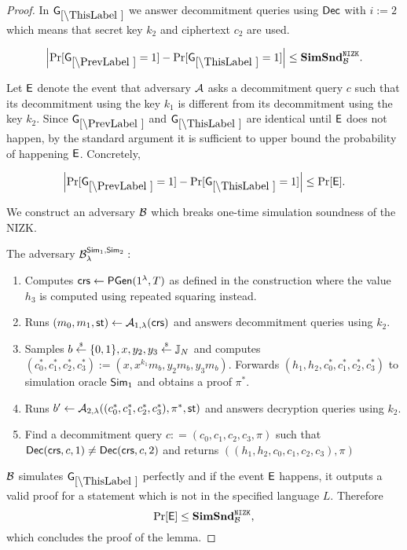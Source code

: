 \begin{proof}

In $\games_\thisgame$ we answer decommitment queries using $\mathsf{Dec}$ with $i:=2$ which means that secret key $k_2$ and ciphertext $c_2$ are used. 

\begin{lemma}
\[
\left|\Pr[\games_\prevgame = 1] - \Pr[\games_\thisgame = 1]\right| \leq \simsnd^\nizk_\advB. 
\]
\end{lemma}

Let $\mathsf{E}$ denote the event that adversary $\mathcal{A}$ asks a decommitment query $c$ such that its decommitment using the key $k_1$ is different from its decommitment using the key $k_2$. Since $\games_\prevgame$ and $\games_\thisgame$ are identical until $\mathsf{E}$ does not happen, by the standard argument it is sufficient to upper bound the probability of happening $\mathsf{E}$. Concretely,  

\[
\left|\Pr[\games_\prevgame = 1] - \Pr[\games_\thisgame = 1]\right| \leq \Pr[\event]. 
\]

We construct an adversary $\mathcal{B}$ which breaks one-time simulation soundness of the NIZK. 

The adversary $\mathcal{B}_{\lambda}^{\mathsf{Sim}_1, \mathsf{Sim}_2}:$
\vspace{-2mm}
\begin{enumerate}
\item Computes $\mathsf{crs} \leftarrow \mathsf{PGen}(1{^{\lambda}}, T)$ as defined in the construction where the value $h_3$ is computed using repeated squaring instead.
\item Runs $(m_0, m_1, \mathsf{st}) \leftarrow \mathcal{A}_{1, \lambda}(\mathsf{crs})$ and answers decommitment queries using $k_2$.
\item Samples $b \stackrel{{\scriptscriptstyle\$}}{\leftarrow} \{0,1\}, x, y_2, y_3 \stackrel{{\scriptscriptstyle\$}}{\leftarrow} \mathbb{J}_N$ and computes $(c_0^*, c_1^*, c_2^*, c_3^*):=(x, x^{k_1} m_b,\allowbreak y_2 m_b, y_3 m_b)$. Forwards $(h_1, h_2, c_0^*, c_1^*, c_2^*, c_3^*)$ to simulation oracle $\mathsf{Sim}_1$ and obtains a proof $\pi^*$.
\item Runs $b' \leftarrow \mathcal{A}_{2, \lambda}((c_0^*, c_1^*, c_2^*, c_3^*), \pi^*, \mathsf{st})$ and answers decryption queries using $k_2$.
\item Find a decommitment query $c: = (c_0, c_1, c_2, c_3, \pi)$ such that $\mathsf{Dec}(\mathsf{crs}, c, 1) \neq \mathsf{Dec}(\mathsf{crs},c,2)$ and returns $((h_1, h_2, c_0, c_1, c_2, c_3), \pi)$
\end{enumerate}

$\mathcal{B}$ simulates $\games_\thisgame$ perfectly and if the event $\mathsf{E}$ happens, it outputs a valid proof for a statement which is not in the specified language $L$. Therefore
\[\Pr[\mathsf{E}] \leq \mathbf{SimSnd}^{\mathtt{NIZK}}_{\mathcal{B}},\]
which concludes the proof of the lemma.  


\end{proof}
